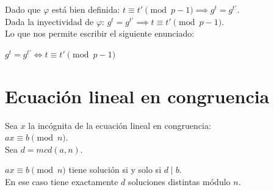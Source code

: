 Dado que $\varphi$ está bien definida: $t\equiv t' \pmod {p-1} \implies g^t=g^{t'}$. \\
Dada la inyectividad de $\varphi$: $g^t=g^{t'} \implies t\equiv t' \pmod {p-1}$. \\
Lo que nos permite escribir el siguiente enunciado:

\begin{enunciado} \label{enun:isoexpo2}\leavevmode\par
$g^t=g^{t'} \iff t\equiv t' \pmod {p-1}$
\end{enunciado}

\section{Ecuación lineal en congruencia}
Sea $x$ la incógnita de la ecuación lineal en congruencia: \\
$ax \equiv b \pmod {n}$. \\
Sea $d = mcd(a,n)$. 

\begin{enunciado} \label{enun:numsolineal}\leavevmode\par
$ax \equiv b \pmod {n}$ tiene solución si y solo si $d \mid b$. \\
En ese caso tiene exactamente $d$ soluciones distintas módulo $n$.
\end{enunciado}

